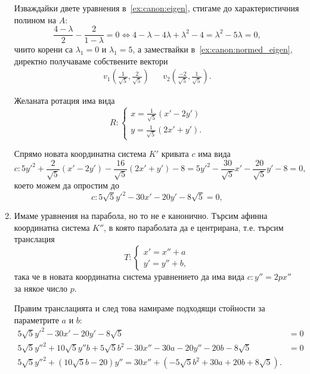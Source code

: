 \documentclass[numbers=endperiod, DIV=15]{scrartcl}
\begin{document}
\begin{solution}
\begin{enumerate}
    Изваждайки двете уравнения в~\ref{ex:canon:eigen}, стигаме до характеристичния полином на $A$:
    \begin{displaymath}
      \frac {4 - \lambda} 2 - \frac 2 {1 - \lambda} = 0 \iff 4 - \lambda - 4\lambda + \lambda^2 - 4 = \lambda^2 - 5\lambda = 0,
    \end{displaymath}
    чиито корени са $\lambda_1 = 0$ и $\lambda_1 = 5$, а замествайки в~\ref{ex:canon:normed_eigen}, директно получаваме собствените вектори
    \begin{align*}
      v_1 \left(\frac 1 {\sqrt 5}, \frac 2 {\sqrt 5} \right)
      &&
      v_2 \left(\frac {-2} {\sqrt 5}, \frac 1 {\sqrt 5} \right).
    \end{align*}

    Желаната ротация има вида
    \begin{displaymath}
      R: \begin{cases}
        x = \frac 1 {\sqrt 5} (x' - 2y') \\
        y = \frac 1 {\sqrt 5} (2x' + y').
      \end{cases}
    \end{displaymath}

    Спрямо новата координатна система $K'$ кривата $c$ има вида
    \begin{displaymath}
      c: 5y'^2 + \frac 2 {\sqrt 5} (x' - 2y') - \frac {16} {\sqrt 5} (2x' + y') - 8 = 5y'^2 - \frac {30} {\sqrt 5} x' - \frac {20} {\sqrt 5} y' - 8 = 0,
    \end{displaymath}
    което можем да опростим до
    \begin{displaymath}
      c: 5 \sqrt 5 y'^2 - 30 x' - 20 y' - 8 \sqrt 5 = 0,
    \end{displaymath}

    \item Имаме уравнения на парабола, но то не е канонично. Търсим афинна координатна система $K''$, в която параболата да е центрирана, т.е. търсим транслация
    \begin{displaymath}
      T: \begin{cases}
        x' = x'' + a \\
        y' = y'' + b,
      \end{cases}
    \end{displaymath}
    така че в новата координатна система уравнението да има вида $c: y'' = 2px''$ за някое число $p$.

    Правим транслацията и след това намираме подходящи стойности за параметрите $a$ и $b$:
    \begin{align*}
      5 \sqrt 5 y'^2 - 30 x' - 20 y' - 8 \sqrt 5 &= 0 \\
      5 \sqrt 5 y''^2 + 10 \sqrt 5 y'' b + 5 \sqrt 5 b^2 - 30 x'' - 30a - 20 y'' - 20b - 8 \sqrt 5 &= 0 \\
      5 \sqrt 5 y''^2 + (10 \sqrt 5 b - 20) y'' = 30 x'' + (- 5 \sqrt 5 b^2 + 30a + 20b + 8 \sqrt 5).
    \end{align*}


\end{enumerate}
\end{solution}
\end{document}
